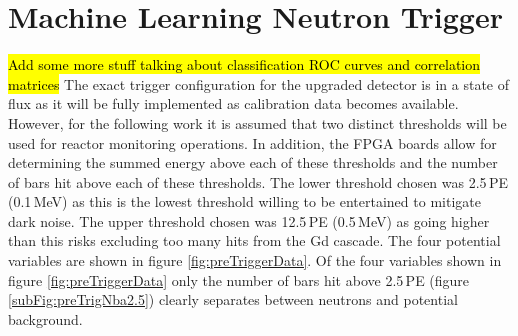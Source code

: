\begin{figure}[!h]
\label{fig:2000_3000_p_secs}
\end{figure}

\clearpage
\section{Machine Learning Neutron Trigger}\label{sec:MachineLearningTrigger}
\hl{Add some more stuff talking about classification ROC curves and correlation matrices} The exact trigger configuration for the upgraded detector is in a state of flux as it will be fully implemented as calibration data becomes available. However, for the following work it is assumed that two distinct thresholds will be used for reactor monitoring operations. In addition, the FPGA boards allow for determining the summed energy above each of these thresholds and the number of bars hit above each of these thresholds. The lower threshold chosen was 2.5\,PE (0.1\,MeV) as this is the lowest threshold willing to be entertained to mitigate dark noise. The upper threshold chosen was 12.5\,PE (0.5\,MeV) as going higher than this risks excluding too many hits from the Gd cascade. The four potential variables are shown in figure \ref{fig:preTriggerData}. Of the four variables shown in figure \ref{fig:preTriggerData} only the number of bars hit above 2.5\,PE (figure \ref{subFig:preTrigNba2.5}) clearly separates between neutrons and potential background.  

